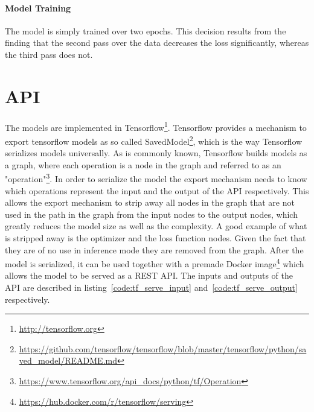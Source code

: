 \paragraph{Model Training}
The model is simply trained over two epochs.
This decision results from the finding that the second pass over the data decreases the loss significantly, whereas the third pass does not.

\section{API}\label{sec:api}
The models are implemented in Tensorflow\footnote{\url{http://tensorflow.org}}.
Tensorflow provides a mechanism to export tensorflow models as so called SavedModel\footnote{\url{https://github.com/tensorflow/tensorflow/blob/master/tensorflow/python/saved_model/README.md}}, which is the way Tensorflow serializes models universally.
As is commonly known, Tensorflow builds models as a graph, where each operation is a node in the graph and referred to as an "operation"\footnote{\url{https://www.tensorflow.org/api_docs/python/tf/Operation}}.
In order to serialize the model the export mechanism needs to know which operations represent the input and the output of the API respectively.
This allows the export mechanism to strip away all nodes in the graph that are not used in the path in the graph from the input nodes to the output nodes, which greatly reduces the model size as well as the complexity.
A good example of what is stripped away is the optimizer and the loss function nodes.
Given the fact that they are of no use in inference mode they are removed from the graph.
After the model is serialized, it can be used together with a premade Docker image\footnote{\url{https://hub.docker.com/r/tensorflow/serving}} which allows the model to be served as a REST API.
The inputs and outputs of the API are described in listing~\ref{code:tf_serve_input} and~\ref{code:tf_serve_output} respectively.

